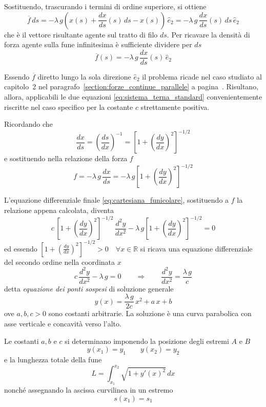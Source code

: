 Sostituendo, trascurando i termini di ordine superiore, si ottiene
\[
 \overline{f}\,ds = -\lambda\,g\left(x(s) + \dfrac{dx}{ds}(s)\,ds - x(s)\right)\,\hat{e}_2 = -\lambda\,g\,\dfrac{dx}{ds}(s)\,ds\,\hat{e}_2 
\]
che è il vettore risultante agente sul tratto di filo $ds$. Per ricavare la densità di forza agente sulla fune infinitesima è sufficiente dividere per $ds$
\[
 \overline{f}(s) = -\lambda\,g\,\dfrac{dx}{ds}(s)\,\hat{e}_2
\]

Essendo $\overline{f}$ diretto lungo la sola direzione $\hat{e}_2$ il problema ricade nel caso studiato al capitolo~2 nel paragrafo~\ref{section:forze_continue_parallele} a pagina~\pageref{section:forze_continue_parallele}. 
Risultano, allora, applicabili le due equazioni \eqref{eq:sistema_terna_standard} convenientemente riscritte nel caso specifico per la costante $c$ strettamente positiva. 

Ricordando che 
\[
 \dfrac{dx}{ds} = \left(\dfrac{ds}{dx}\right)^{-1} = \left[1+\left(\dfrac{dy}{dx}\right)^2\right]^{-1/2}
\]
e sostituendo nella relazione della forza $f$
\[
 f = -\lambda\,g\,\dfrac{dx}{ds} = -\lambda\,g\left[1+\left(\dfrac{dy}{dx}\right)^2\right]^{-1/2}
\]

L'equazione differenziale finale \eqref{eq:cartesiana_funicolare}, sostituendo a $f$ la relazione appena calcolata, diventa
\begin{equation*}
 c\,\left[1+ \left(\dfrac{dy}{dx}\right)^2\right]^{-1/2}\,\dfrac{d^2 y}{dx^2} -\lambda\,g\left[1+\left(\dfrac{dy}{dx}\right)^2\right]^{-1/2} = 0
\end{equation*}
ed essendo $\left[1+\left(\frac{dy}{dx}\right)^2\right]^{-1/2}>0\quad\forall x\in\mathbb{R}$ si ricava una equazione differenziale del secondo ordine nella coordinata $x$
\begin{equation}
 \label{eq:equazione_differenziale_ponte_sospeso}
 c\,\dfrac{d^2y}{dx^2} - \lambda\,g = 0\qquad \Longrightarrow\qquad \dfrac{d^2y}{dx^2} = \dfrac{\lambda\,g}{c}
\end{equation}
detta \emph{equazione dei ponti sospesi} di soluzione generale 
\begin{equation}
\label{eq:equazione_ponte_sospeso}
 y(x) = \dfrac{\lambda\,g}{2 c}\,x^2 + a\,x+ b
\end{equation}
ove $a,b,c >0$ sono costanti arbitrarie. La soluzione è una curva parabolica con asse verticale e concavità verso l'alto.

Le costanti $a,b$ e $c$ si determinano imponendo la posizione degli estremi $A$ e $B$
\[
 y(x_1) = y_1 \qquad y(x_2)=y_2
\]
e la lunghezza totale della fune
\[
 L = \int_{x_1}^{x_2} \sqrt{1+y'(x)^2}\,dx
\]
nonché assegnando la ascissa curvilinea in un estremo
\[
 s(x_1) = s_1
\]

